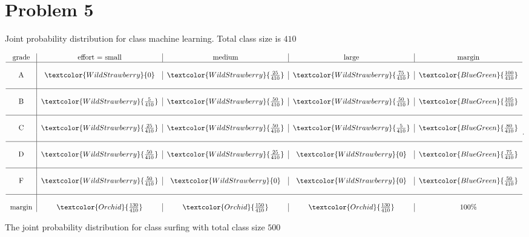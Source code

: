 \section{Problem 5}%

Joint probability distribution for class machine learning. Total class size is
$410$

\[
\begin{tabular}{c | c | c | c | c}
  grade & effort = small & medium & large & margin \\
  \hline \\
  A & $ \textcolor{WildStrawberry}{0}
  $ & $ \textcolor{WildStrawberry}{\frac{25}{410}
  } $ & $ \textcolor{WildStrawberry}{\frac{75}{410}} $ & $ \textcolor{BlueGreen}{\frac{100}{410}} $\\ \\
  \hline \\
  B & $ \textcolor{WildStrawberry}{\frac{5}{410}}$ & $\textcolor{WildStrawberry}{\frac{50}{410}} $ & $\textcolor{WildStrawberry}{\frac{50}{410}} $ & $ \textcolor{BlueGreen}{\frac{105}{410}} $\\ \\
  \hline \\
  C & $ \textcolor{WildStrawberry}{\frac{25}{410}}
  $ & $ \textcolor{WildStrawberry}{\frac{50}{410}}
  $ & $ \textcolor{WildStrawberry}{\frac{5}{410}} $ & $ \textcolor{BlueGreen}{\frac{80}{410}} $\\\\
  \hline \\
  D & $ \textcolor{WildStrawberry}{\frac{50}{410}}
  $ & $ \textcolor{WildStrawberry}{\frac{25}{410}}
  $ & $ \textcolor{WildStrawberry}{0} $ & $ \textcolor{BlueGreen}{\frac{75}{410}} $\\\\
  \hline \\
  F & $ \textcolor{WildStrawberry}{\frac{50}{410}}
  $ & $ \textcolor{WildStrawberry}{0} $ & $ \textcolor{WildStrawberry}{0}
  $ & $ \textcolor{BlueGreen}{\frac{50}{410}} $ \\\\ 
  \hline \\
  margin & $ \textcolor{Orchid}{\frac{130}{410}}
  $ & $ \textcolor{Orchid}{\frac{150}{410}} $ & $ \textcolor{Orchid}{\frac{130}{410}} $ & $100\%$
\end{tabular}
.\] 

The joint probability distribution for class surfing with total class size $500$

